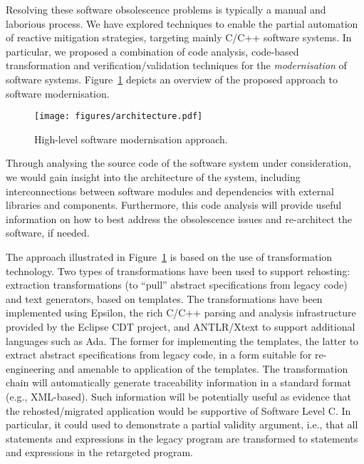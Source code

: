 \documentclass{llncs}
\begin{document}
Resolving these software obsolescence problems is typically a manual and laborious process. We have explored techniques to enable the partial 
automation of reactive mitigation strategies, targeting mainly C/C++ software 
systems. In particular, we proposed a combination of code analysis, code-based 
transformation and verification/validation techniques for the 
\textit{modernisation} of software systems.
Figure~\ref{fig:approach} depicts an overview of the proposed approach to 
software modernisation. 

\begin{figure}[htbp]
	\vspace*{-2em}
	\centering
	\texttt{[image: figures/architecture.pdf]}
	
	\caption{High-level software modernisation approach.}
	\label{fig:approach}
	
	\vspace*{-2em}
\end{figure}

Through analysing the source code of the software system under consideration, 
we would gain insight into the architecture of the system, including 
interconnections between software modules and dependencies with 
external libraries and components. Furthermore, this code analysis will provide 
useful information on how to best address the obsolescence issues and 
re-architect the software, if needed.

The approach illustrated in Figure~\ref{fig:approach} is based on the use of transformation technology.
Two types of transformations have been used to support rehosting: extraction 
transformations (to “pull” abstract specifications from legacy code) and text 
generators, based on templates. The transformations have been implemented using Epsilon, the rich C/C++ parsing and analysis 
infrastructure provided by the Eclipse CDT project, and ANTLR/Xtext to support 
additional languages 
such as Ada. The former for implementing the templates, the latter to extract 
abstract specifications from legacy code, in a form suitable for re-engineering 
and amenable to application of the templates. 
The transformation chain will automatically generate traceability 
information in a standard format (e.g., XML-based). Such information will be potentially useful as
evidence that the rehosted/migrated application would be supportive of Software Level C.
In particular, it could used to demonstrate a partial validity argument, 
i.e., that all statements and expressions in the legacy program are transformed 
to statements and expressions in the retargeted program. 
\end{document}
